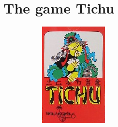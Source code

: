 \chapter{The game Tichu}

\begin{figure}[ht]
    \begin{center}
        \begin{subfigure}[h]{.3\textwidth}\includegraphics[width=\textwidth]{images/tichu_box}\end{subfigure}~

\end{center}
\end{figure}
